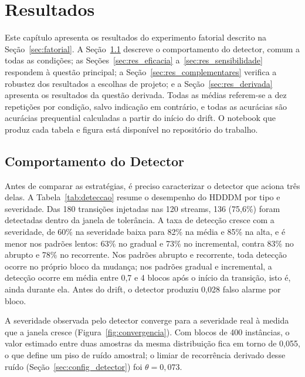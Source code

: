 \chapter{Resultados}
\label{chap:resultados}

Este capítulo apresenta os resultados do experimento fatorial descrito na
Seção~\ref{sec:fatorial}. A Seção~\ref{sec:res_detector} descreve o
comportamento do detector, comum a todas as condições; as
Seções~\ref{sec:res_eficacia} a~\ref{sec:res_sensibilidade} respondem à
questão principal; a Seção~\ref{sec:res_complementares} verifica a
robustez dos resultados a escolhas de projeto; e a
Seção~\ref{sec:res_derivada} apresenta os resultados da questão derivada. Todas as médias referem-se a dez repetições por
condição, salvo indicação em contrário, e todas as acurácias são acurácias
prequential calculadas a partir do início do drift. O notebook que produz
cada tabela e figura está disponível no repositório do trabalho.

\section{Comportamento do Detector}
\label{sec:res_detector}

Antes de comparar as estratégias, é preciso caracterizar o detector que
aciona três delas. A Tabela~\ref{tab:deteccao} resume o desempenho do HDDDM
por tipo e severidade. Das 180 transições injetadas nas 120 streams, 136
(75,6\%) foram detectadas dentro da janela de tolerância. A taxa de detecção
cresce com a severidade, de 60\% na severidade baixa para 82\% na média e
85\% na alta, e é menor nos padrões lentos: 63\% no gradual e 73\% no
incremental, contra 83\% no abrupto e 78\% no recorrente. Nos padrões
abrupto e recorrente, toda detecção ocorre no próprio bloco da mudança; nos
padrões gradual e incremental, a detecção ocorre em média entre 0,7 e 4
blocos após o início da transição, isto é, ainda durante ela. Antes do
drift, o detector produziu 0,028 falso alarme por bloco.



A severidade observada pelo detector converge para a severidade real à
medida que a janela cresce (Figura~\ref{fig:convergencia}). Com blocos de 400
instâncias, o valor estimado entre duas amostras da mesma distribuição fica
em torno de 0,055, o que define um piso de ruído amostral; o limiar de
recorrência derivado desse ruído (Seção~\ref{sec:config_detector}) foi
$\theta = 0{,}073$.

